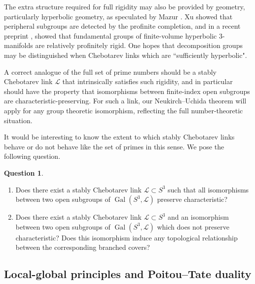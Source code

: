 \documentclass{amsart}
\theoremstyle{plain}
\theoremstyle{definition}
\theoremstyle{plain}
\theoremstyle{plain}
\theoremstyle{plain}
\theoremstyle{remark}
\theoremstyle{remark}
\theoremstyle{plain}
\theoremstyle{definition}
\newtheorem{question}[theorem]{Question}
\theoremstyle{plain}
\DeclareMathOperator{\Gal}{\mathrm{Gal}}
\theoremstyle{plain}
\theoremstyle{plain}
\numberwithin{equation}{section}
\begin{document}
\medskip

The extra structure required for full rigidity may also be provided by geometry, particularly hyperbolic geometry, as speculated by Mazur \cite{mazur}. Xu \cite{xu} showed that peripheral subgroups are detected by the profinite completion, and in a recent preprint \cite{Xu26}, showed that fundamental groups of finite-volume hyperbolic 3-manifolds are relatively profinitely rigid. One hopes that decomposition groups may be distinguished when Chebotarev links which are ``sufficiently hyperbolic".

\medskip

A correct analogue of the full set of prime numbers should be a stably Chebotarev link $\mathcal{L}$ that intrinsically satisfies such rigidity, and in particular should have the property that isomorphisms between finite-index open subgroups are characteristic-preserving. For such a link, our Neukirch--Uchida theorem will apply for any group theoretic isomorphism, reflecting the full number-theoretic situation. 

\medskip

It would be interesting to know the extent to which stably Chebotarev links behave or do not behave like the set of primes in this sense. We pose the following question.

\begin{question}
\begin{enumerate}
    \item Does there exist a stably Chebotarev link $\mathcal{L} \subset S^3$ such that all isomorphisms between two open subgroups of $\Gal(S^3, \mathcal{L})$ preserve characteristic?
    \item Does there exist a stably Chebotarev link $\mathcal{L} \subset S^3$ and an isomorphism between two open subgroups of $\Gal(S^3, \mathcal{L})$ which does not preserve characteristic? Does this isomorphism induce any topological relationship between the corresponding branched covers? 
\end{enumerate}
\end{question}

\subsection{Local-global principles and Poitou--Tate duality}
\end{document}
